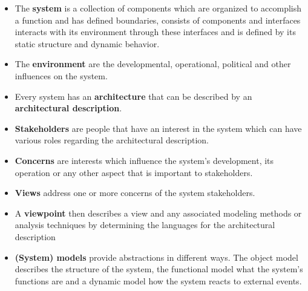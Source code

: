 \begin{itemize}
  \item The \textbf{system} is a collection of components which are organized to accomplish a function and has defined boundaries, consists of components and interfaces interacts with its environment through these interfaces and is defined by its static structure and dynamic behavior.
  \item The \textbf{environment} are the developmental, operational, political and other influences on the system.
  \item Every system has an \textbf{architecture} that can be described by an \textbf{architectural description}.
  \item \textbf{Stakeholders} are people that have an interest in the system which can have various roles regarding the architectural description.
  \item \textbf{Concerns} are interests which influence the system's development, its operation or any other aspect that is important to stakeholders.
  \item \textbf{Views} address one or more concerns of the system stakeholders.
  \item A \textbf{viewpoint} then describes a view and any associated modeling methods or analysis techniques by determining the languages for the architectural description
  \item \textbf{(System) models} provide abstractions in different ways.
    The object model describes the structure of the system, the functional model what the system's functions are and a dynamic model how the system reacts to external events.
\end{itemize}

